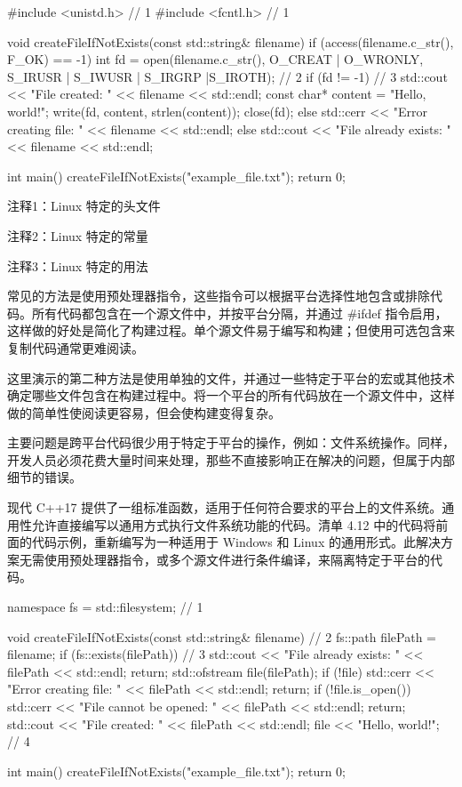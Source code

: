 
\begin{cpp}
#include <unistd.h> // 1
#include <fcntl.h> // 1

void createFileIfNotExists(const std::string& filename) {
  if (access(filename.c_str(), F_OK) == -1) {
    int fd = open(filename.c_str(), O_CREAT | O_WRONLY, S_IRUSR
         | S_IWUSR | S_IRGRP |S_IROTH); // 2
    if (fd != -1) { // 3
      std::cout << "File created: " << filename << std::endl;
      const char* content = "Hello, world!\n";
      write(fd, content, strlen(content));
      close(fd);
    } else
      std::cerr << "Error creating file: " << filename << std::endl;
    } else
      std::cout << "File already exists: " << filename << std::endl;
}

int main() {
  createFileIfNotExists("example_file.txt");
  return 0;
}
\end{cpp}

{\footnotesize
注释1：Linux 特定的头文件

注释2：Linux 特定的常量

注释3：Linux 特定的用法
}


常见的方法是使用预处理器指令，这些指令可以根据平台选择性地包含或排除代码。所有代码都包含在一个源文件中，并按平台分隔，并通过 \#ifdef 指令启用，这样做的好处是简化了构建过程。单个源文件易于编写和构建；但使用可选包含来复制代码通常更难阅读。

这里演示的第二种方法是使用单独的文件，并通过一些特定于平台的宏或其他技术确定哪些文件包含在构建过程中。将一个平台的所有代码放在一个源文件中，这样做的简单性使阅读更容易，但会使构建变得复杂。

主要问题是跨平台代码很少用于特定于平台的操作，例如：文件系统操作。同样，开发人员必须花费大量时间来处理，那些不直接影响正在解决的问题，但属于内部细节的错误。


现代 C++17 提供了一组标准函数，适用于任何符合要求的平台上的文件系统。通用性允许直接编写以通用方式执行文件系统功能的代码。清单 4.12 中的代码将前面的代码示例，重新编写为一种适用于 Windows 和 Linux 的通用形式。此解决方案无需使用预处理器指令，或多个源文件进行条件编译，来隔离特定于平台的代码。


\begin{cpp}
namespace fs = std::filesystem; // 1

void createFileIfNotExists(const
    std::string& filename) { // 2
  fs::path filePath = filename;
  if (fs::exists(filePath)) { // 3
    std::cout << "File already exists: " << filePath << std::endl;
    return;
  }
  std::ofstream file(filePath);
  if (!file) {
    std::cerr << "Error creating file: " << filePath << std::endl;
    return;
  }
  if (!file.is_open()) {
    std::cerr << "File cannot be opened: " << filePath << std::endl;
    return;
  }
  std::cout << "File created: " << filePath << std::endl;
  file << "Hello, world!\n"; // 4
}

int main() {
  createFileIfNotExists("example_file.txt");
  return 0;
}
\end{cpp}

